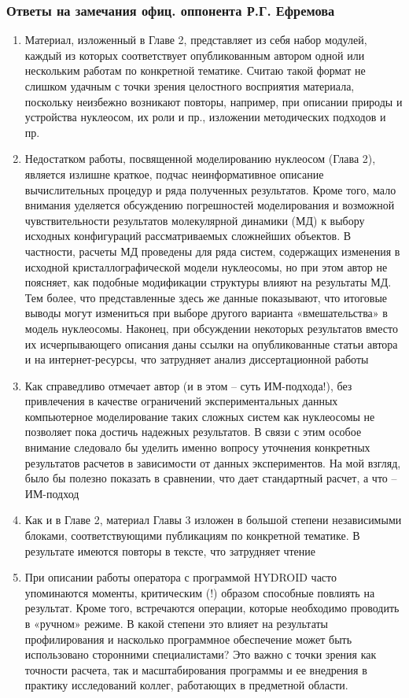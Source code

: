 \begin{frame}[allowframebreaks]
    \frametitle{Ответы на замечания офиц. оппонента Р.Г. Ефремова}
    \begin{enumerate}
        \item     Материал, изложенный в Главе 2, представляет из себя набор модулей, каждый из которых соответствует опубликованным автором одной или нескольким работам по конкретной тематике. Считаю такой формат не слишком удачным с точки зрения целостного восприятия материала, поскольку неизбежно возникают повторы, например, при описании природы и устройства нуклеосом, их роли и пр., изложении методических подходов и пр. 
        \item    Недостатком работы, посвященной моделированию нуклеосом (Глава 2), является излишне краткое, подчас неинформативное описание вычислительных процедур и ряда полученных результатов. Кроме того, мало внимания уделяется обсуждению погрешностей моделирования и возможной чувствительности результатов молекулярной динамики (МД) к выбору исходных конфигураций рассматриваемых сложнейших объектов. В частности, расчеты МД проведены для ряда систем, содержащих изменения в исходной кристаллографической модели нуклеосомы, но при этом автор не поясняет, как подобные модификации структуры влияют на результаты МД. Тем более, что представленные здесь же данные показывают, что итоговые выводы могут измениться при выборе другого варианта «вмешательства» в модель нуклеосомы. Наконец, при обсуждении некоторых результатов вместо их исчерпывающего описания даны ссылки на опубликованные статьи автора и на интернет-ресурсы, что затрудняет анализ диссертационной работы 
        \item    Как справедливо отмечает автор (и в этом – суть ИМ-подхода!), без привлечения в качестве ограничений экспериментальных данных компьютерное моделирование таких сложных систем как нуклеосомы не позволяет пока достичь надежных результатов. В связи с этим особое внимание следовало бы уделить именно вопросу уточнения конкретных результатов расчетов в зависимости от данных экспериментов. На мой взгляд, было бы полезно показать в сравнении, что дает стандартный расчет, а что – ИМ-подход 
        \item    Как и в Главе 2, материал Главы 3 изложен в большой степени независимыми блоками, соответствующими публикациям по конкретной тематике. В результате имеются повторы в тексте, что затрудняет чтение 
        \item     При описании работы оператора с программой HYDROID часто упоминаются моменты, критическим (!) образом способные повлиять на результат. Кроме того, встречаются операции, которые необходимо проводить в «ручном» режиме. В какой степени это влияет на результаты профилирования и насколько программное обеспечение может быть использовано сторонними специалистами? Это важно с точки зрения как точности расчета, так и масштабирования программы и ее внедрения в практику исследований коллег, работающих в предметной области. 

\end{enumerate}
\end{frame}
